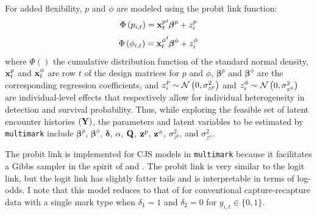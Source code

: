 \documentclass[12pt]{article}
\begin{document}
For added flexibility, $p$ and $\phi$ are modeled using the probit link function:
\begin{equation*}
  \Phi \left( p_{i,t} \right) = {{\bf x}^p_t}^\prime \boldsymbol{\beta}^p + z^p_i
\end{equation*}
\begin{equation*}
  \Phi \left( \phi_{i,t} \right) = {{\bf x}^\phi_t}^\prime \boldsymbol{\beta}^\phi + z^\phi_i
\end{equation*}
where $\Phi()$ the cumulative distribution function of the standard normal density, ${\bf x}^p_t$ and ${\bf x}^\phi_t$ are row $t$ of the design matrices for $p$ and $\phi$, $\boldsymbol{\beta}^p$ and $\boldsymbol{\beta}^\phi$ are the corresponding regression coefficients, and $z^p_i \sim {\cal N} \left( 0,\sigma^2_{z^p} \right)$ and $z^\phi_i \sim {\cal N} \left( 0,\sigma^2_{z^\phi} \right)$ are individual-level effects that respectively allow for individual heterogeneity in detection and survival probability. Thus, while exploring the feasible set of latent encounter histories $({\bf Y})$, the parameters and latent variables to be estimated by \verb|multimark| include ${\boldsymbol \beta}^p$, ${\boldsymbol\beta}^\phi$, ${\boldsymbol \delta}$, $\alpha$, ${\bf Q}$, ${\bf z}^p$, ${\bf z}^\phi$, $\sigma^2_{z^p}$, and $\sigma^2_{z^\phi}$. 

The probit link is implemented for CJS models in \verb|multimark| because it facilitates a Gibbs sampler in the spirit of \cite{Albert&Chib1993} and \cite{LaakeEtAl2013}.  The probit link is very similar to the logit link, but the logit link has slightly fatter tails and is interpretable in terms of log-odds. I note that this model reduces to that of \cite{LaakeEtAl2013} for conventional capture-recapture data with a single mark type when $\delta_1=1$ and $\delta_2=0$ for $y_{i,t} \in \{0,1\}$.
\end{document}
